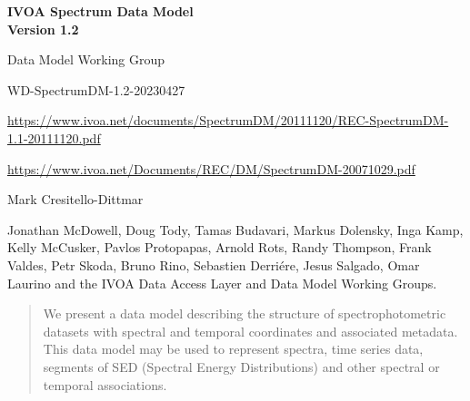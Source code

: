 \documentclass[11pt]{article}
\newcommand{\htmtitle}[2]{\parbox{6.0in}{ \bf \huge #1 \\  \Large  #2}}
\newcommand{\heol}{} %
\newcommand{\link}[1]{{\color{dblue}\htmladdnormallink{#1}{}\par}}
\begin{document}
\vskip -1in
\heol
{}

\color{dblue}
\vskip 0.2in
\par\noindent \htmtitle{IVOA Spectrum Data Model}{Version 1.2}
\Large
\vskip 0.1in
\par{}
\color{black}
\vskip 0.2in

\normalsize

\par{}

Data Model Working Group

\par{}

{ 
\color{dblue}
WD-SpectrumDM-1.2-20230427
}

\par{}

{\color{dblue}
  \url{https://www.ivoa.net/documents/SpectrumDM/20111120/REC-SpectrumDM-1.1-20111120.pdf}
  
  \url{https://www.ivoa.net/Documents/REC/DM/SpectrumDM-20071029.pdf}
}

\vskip 0.2in


Mark Cresitello-Dittmar


Jonathan McDowell, Doug Tody, 
Tamas Budavari,  Markus Dolensky, Inga Kamp, 
Kelly McCusker, Pavlos Protopapas, Arnold Rots, Randy Thompson, Frank Valdes, Petr Skoda, Bruno Rino,
Sebastien Derri\'{e}re, Jesus Salgado, Omar Laurino
and the IVOA Data Access Layer and Data Model Working Groups.


\begin{abstract}

We present a data model describing the structure of spectrophotometric
datasets with spectral and temporal coordinates and associated metadata.
This data model may be used to represent 
spectra, time series data,
segments of SED (Spectral Energy Distributions) and other
spectral or temporal associations.

\end{abstract}
\end{document}
